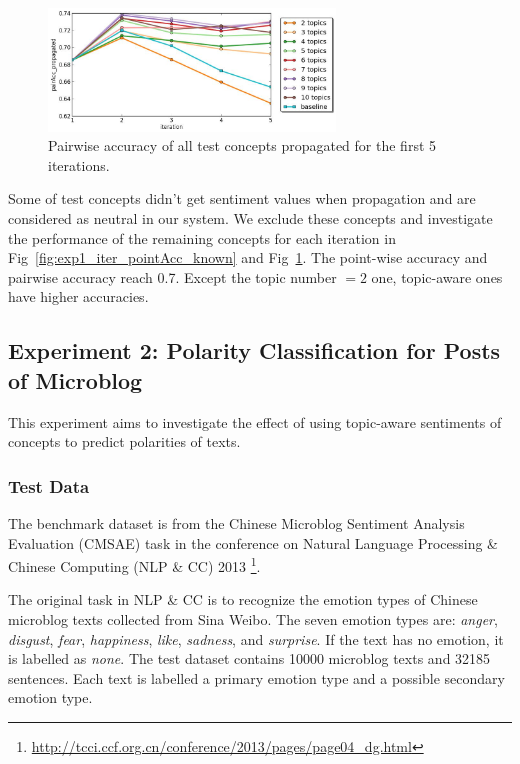 \begin{figure}[!t]
\centering
\includegraphics[width=3in]{fig/exp1_iterations/pairAcc_propagated.jpg}
\caption{Pairwise accuracy of all test concepts propagated for the first 5 iterations.}
\label{fig:exp1_iter_pairAcc_known}
\end{figure}

Some of test concepts didn't get sentiment values when propagation and are considered as neutral in our system. We exclude these concepts and investigate the performance of the remaining concepts for each iteration in Fig~\ref{fig:exp1_iter_pointAcc_known} and Fig~\ref{fig:exp1_iter_pairAcc_known}. The point-wise accuracy and pairwise accuracy reach 0.7. Except the topic number $=2$ one, topic-aware ones have higher accuracies.


\subsection{Experiment 2: Polarity Classification for Posts of Microblog}
This experiment aims to investigate the effect of using topic-aware sentiments of concepts to predict polarities of texts. 

\subsubsection{Test Data}
The benchmark dataset is from the Chinese Microblog Sentiment Analysis Evaluation (CMSAE) task in the conference on Natural Language Processing \& Chinese Computing (NLP \& CC) 2013 \footnote{\url{http://tcci.ccf.org.cn/conference/2013/pages/page04_dg.html}}.

The original task in NLP \& CC is to recognize the emotion types of Chinese microblog texts collected from Sina Weibo. The seven emotion types are: {\it anger}, {\it disgust}, {\it fear}, {\it happiness}, {\it like}, {\it sadness}, and {\it surprise}. If the text has no emotion, it is labelled as {\it none}. The test dataset contains 10000 microblog texts and 32185 sentences. Each text is labelled a primary emotion type and a possible secondary emotion type. 

